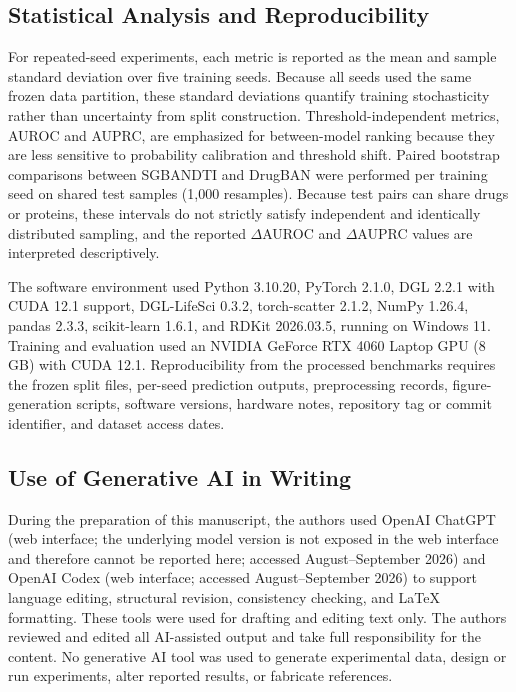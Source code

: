 \documentclass[computers,article,submit,moreauthors]{Definitions/mdpi}
\begin{document}
\subsection{Statistical Analysis and Reproducibility}
For repeated-seed experiments, each metric is reported as the mean and sample standard deviation over five training seeds. Because all seeds used the same frozen data partition, these standard deviations quantify training stochasticity rather than uncertainty from split construction. Threshold-independent metrics, AUROC and AUPRC, are emphasized for between-model ranking because they are less sensitive to probability calibration and threshold shift. Paired bootstrap comparisons between SGBANDTI and DrugBAN were performed per training seed on shared test samples (1,000 resamples). Because test pairs can share drugs or proteins, these intervals do not strictly satisfy independent and identically distributed sampling, and the reported $\Delta$AUROC and $\Delta$AUPRC values are interpreted descriptively.

The software environment used Python 3.10.20, PyTorch 2.1.0, DGL 2.2.1 with CUDA 12.1 support, DGL-LifeSci 0.3.2, torch-scatter 2.1.2, NumPy 1.26.4, pandas 2.3.3, scikit-learn 1.6.1, and RDKit 2026.03.5, running on Windows 11. Training and evaluation used an NVIDIA GeForce RTX 4060 Laptop GPU (8 GB) with CUDA 12.1. Reproducibility from the processed benchmarks requires the frozen split files, per-seed prediction outputs, preprocessing records, figure-generation scripts, software versions, hardware notes, repository tag or commit identifier, and dataset access dates.

\subsection{Use of Generative AI in Writing}
During the preparation of this manuscript, the authors used OpenAI ChatGPT (web interface; the underlying model version is not exposed in the web interface and therefore cannot be reported here; accessed August--September 2026) and OpenAI Codex (web interface; accessed August--September 2026) to support language editing, structural revision, consistency checking, and LaTeX formatting. These tools were used for drafting and editing text only. The authors reviewed and edited all AI-assisted output and take full responsibility for the content. No generative AI tool was used to generate experimental data, design or run experiments, alter reported results, or fabricate references.
\end{document}
